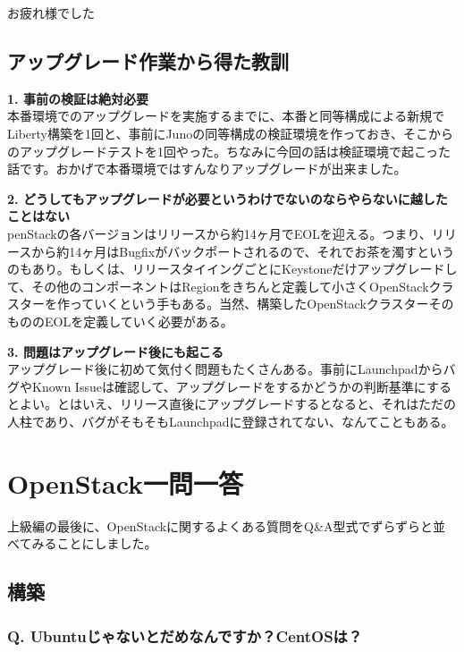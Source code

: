 \documentclass[9pt,b5paper,tombo,openany]{jsbook}
\begin{document}
\noindent
お疲れ様でした

\section{アップグレード作業から得た教訓}
\noindent
\textbf{1. 事前の検証は絶対必要}\\[1ex]

本番環境でのアップグレードを実施するまでに、本番と同等構成による新規でLiberty構築を1回と、事前にJunoの同等構成の検証環境を作っておき、そこからのアップグレードテストを1回やった。ちなみに今回の話は検証環境で起こった話です。おかげで本番環境ではすんなりアップグレードが出来ました。

\noindent
\textbf{2. どうしてもアップグレードが必要というわけでないのならやらないに越したことはない}\\[1ex]

penStackの各バージョンはリリースから約14ヶ月でEOLを迎える。つまり、リリースから約14ヶ月はBugfixがバックポートされるので、それでお茶を濁すというのもあり。もしくは、リリースタイイングごとにKeystoneだけアップグレードして、その他のコンポーネントはRegionをきちんと定義して小さくOpenStackクラスターを作っていくという手もある。当然、構築したOpenStackクラスターそのもののEOLを定義していく必要がある。

\noindent
\textbf{3. 問題はアップグレード後にも起こる}\\[1ex]

アップグレード後に初めて気付く問題もたくさんある。事前にLaunchpadからバグやKnown Issueは確認して、アップグレードをするかどうかの判断基準にするとよい。とはいえ、リリース直後にアップグレードするとなると、それはただの人柱であり、バグがそもそもLaunchpadに登録されてない、なんてこともある。

\chapter{OpenStack一問一答}

上級編の最後に、OpenStackに関するよくある質問をQ\&A型式でずらずらと並べてみることにしました。

\section{構築}

\subsection*{{\LARGE\bfseries Q.} Ubuntuじゃないとだめなんですか？CentOSは？}
\end{document}
